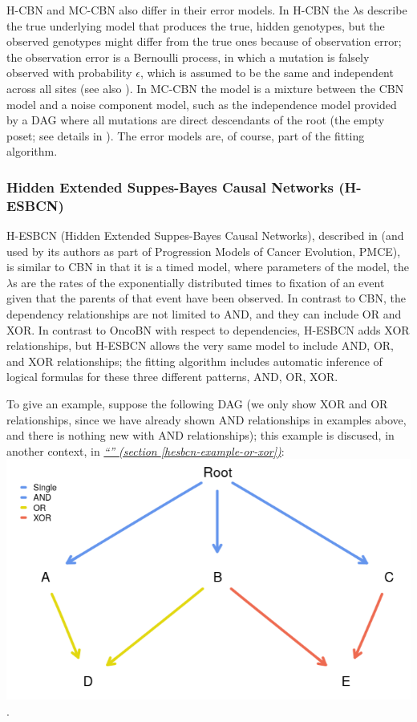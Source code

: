 \documentclass[a4paper,11pt]{article}
\newcommand*{\qref}[1]{\hyperref[{#1}]{\textit{``\nameref*{#1}'' (section \ref*{#1})}}}
\begin{document}
H-CBN and MC-CBN also differ in their error models. In H-CBN the $\lambda$s describe the true underlying model that produces the true, hidden genotypes, but the observed genotypes might differ from the true ones because of observation error; the observation error is a Bernoulli process, in which a mutation is falsely observed with probability $\epsilon$,   which is assumed to be the same and independent across all sites (see also \citealp[p.~2319]{Sakoparnig2012}). In MC-CBN the model is a mixture between the CBN model and a noise component model, such as the independence model provided by a DAG where all mutations are direct descendants of the root (the empty poset; see details in \citealp[p.~i731]{montazeri2016large}). The error models are, of course, part of the fitting algorithm.




\subsubsection{Hidden Extended Suppes-Bayes Causal Networks (H-ESBCN)} \label{hesbcndetails}

H-ESBCN (Hidden Extended Suppes-Bayes Causal Networks), described in \citet{angaroni2021} (and used by its authors as part of Progression Models of Cancer Evolution, PMCE), is similar to CBN in that it is a timed model, where parameters of the model, the $\lambda$s are  the rates of the exponentially distributed times to fixation of an  event given that the parents of that event have been observed. In contrast to CBN, the dependency relationships are not limited to AND, and they can include OR and XOR. In contrast to OncoBN with respect to dependencies, H-ESBCN adds XOR relationships, but H-ESBCN allows the very same model to include AND, OR, and XOR relationships; the fitting algorithm includes automatic inference of logical formulas for these three different patterns, AND, OR, XOR.


To give an example, suppose the following DAG (we only show XOR and OR relationships, since we have already shown AND relationships in examples above, and there is nothing new with AND relationships); this example is discused, in another context, in \qref{hesbcn-example-or-xor}:\\

\includegraphics[width=.60\linewidth]{./dag-h-1.png}.\\
\end{document}
